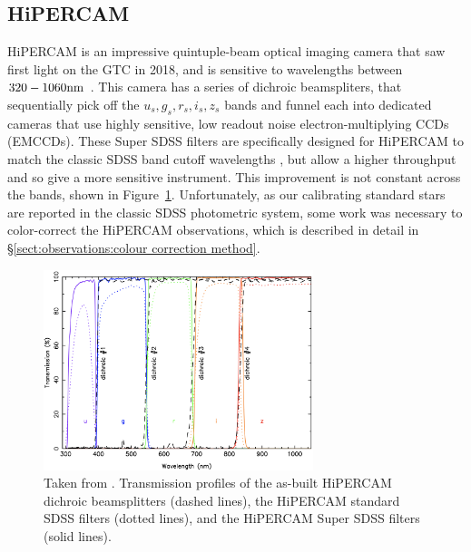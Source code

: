 \subsection{HiPERCAM}
HiPERCAM is an impressive quintuple-beam optical imaging camera that saw first light on the GTC in 2018, and is sensitive to wavelengths between $320 - 1060 \rm nm$ \citep{dhillon2021}. This camera has a series of dichroic beamspliters, that sequentially pick off the $u_s, g_s, r_s, i_s, z_s$ bands and funnel each into dedicated cameras that use highly sensitive, low readout noise electron-multiplying CCDs (EMCCDs). These Super SDSS filters are specifically designed for HiPERCAM to match the classic SDSS band cutoff wavelengths \citep{fukugita1996}, but allow a higher throughput and so give a more sensitive instrument. This improvement is not constant across the bands, shown in Figure~\ref{fig:observations:superSDSS throughput comparison}. Unfortunately, as our calibrating standard stars are reported in the classic SDSS photometric system, some work was necessary to color-correct the HiPERCAM observations, which is described in detail in \S\ref{sect:observations:colour correction method}.
\begin{figure}
    \centering
    \includegraphics[width=0.7\textwidth]{figures/observations/plot_dichs_supersdss_asbuilt_v3.png}
    \caption{Taken from \citet{dhillon2021}. Transmission profiles of the as-built HiPERCAM dichroic beamsplitters (dashed lines), the HiPERCAM standard SDSS filters (dotted lines), and the HiPERCAM Super SDSS filters (solid
    lines).}
    \label{fig:observations:superSDSS throughput comparison}
\end{figure}

